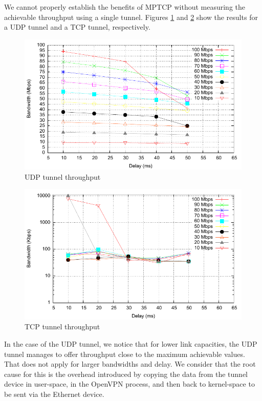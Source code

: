 
We cannot properly establish the benefits of MPTCP without measuring the
achievable throughput using a single tunnel. Figures \ref{fig:udp} and
\ref{fig:tcp} show the results for a UDP tunnel and a TCP tunnel,
respectively.

\begin{figure}
  \centering
  \includegraphics[width=\textwidth]{img/test-udp}
  \caption{UDP tunnel throughput}
  \label{fig:udp}
\end{figure}

\begin{figure}
  \centering
  \includegraphics[width=\textwidth]{img/test-tcp}
  \caption{TCP tunnel throughput}
  \label{fig:tcp}
\end{figure}

In the case of the UDP tunnel, we notice that for lower link capacities, the
UDP tunnel manages to offer throughput close to the maximum achievable values.
That does not apply for larger bandwidths and delay. We consider that the root
cause for this is the overhead introduced by copying the data from the tunnel
device in user-space, in the OpenVPN process, and then back to kernel-space to
be sent via the Ethernet device.

